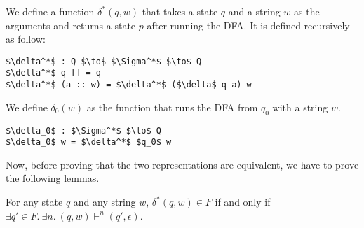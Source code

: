 \begin{defn}
\noindent We define a function \(\delta^*(q,w)\) that takes a state \(q\) and
a string \(w\) as the arguments and returns a state \(p\) after
running the DFA. It is defined recursively as follow: 
\begin{lstlisting}[mathescape=true,xleftmargin=.3\textwidth]
$\delta^*$ : Q $\to$ $\Sigma^*$ $\to$ Q
$\delta^*$ q [] = q
$\delta^*$ (a :: w) = $\delta^*$ ($\delta$ q a) w
\end{lstlisting}
\end{defn}

\begin{defn}
\noindent We define \(\delta_0(w)\) as the function that runs the DFA
from \(q_0\) with a string \(w\). 
\begin{lstlisting}[mathescape=true,xleftmargin=.3\textwidth]
$\delta_0$ : $\Sigma^*$ $\to$ Q
$\delta_0$ w = $\delta^*$ $q_0$ w
\end{lstlisting}
\end{defn}

\par Now, before proving that the two representations are equivalent, we have to prove the following lemmas. 

\begin{lem}
\label{lem:dec_iff}
\noindent For any state \(q\) and any string \(w\), \(\delta^*(q,w) \in F\) if and only
if \(\exists q'\in F.\ \exists n.\ (q,w) \vdash^n (q',\epsilon)\).
\end{lem}

